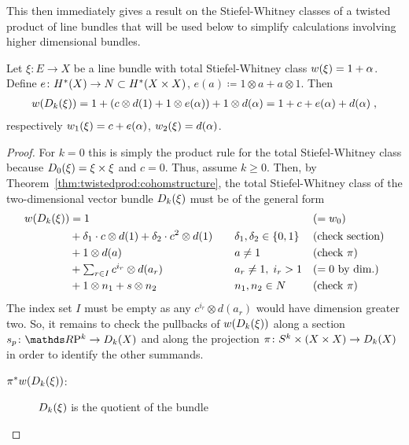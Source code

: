 This then immediately gives a result on the Stiefel-Whitney classes of
a twisted product of line bundles that will be used below to simplify
calculations involving higher dimensional bundles.
\begin{Cor}\label{cor:twistedprod:swlinebdl}
  Let $\xi\colon E\to X$ be a line bundle with total Stiefel-Whitney
  class ${w}(\xi)=1+\alpha$.
  Define $e\colon H^*(X)\to N\subset H^*(X\times X)$,
  $e(a)\coloneqq 1\otimes a+a\otimes 1$.
  Then
  \begin{gather*}
    {w}(D_{k}({\xi})) = 1+ (c\otimes d(1)+1\otimes
    e(\alpha)) + 1\otimes d(\alpha)
    = 1+c+e(\alpha)+d(\alpha)
    \;,
  \end{gather*}
  respectively ${w_{1}}(\xi) = c+e(\alpha)$, ${w_{2}}(\xi)=d(\alpha)$.
  \begin{proof}
    For $k=0$ this is simply the product rule for the total
    Stiefel-Whitney class because $D_{0}({\xi})=\xi\times\xi$
    and $c=0$. Thus, assume $k\geq0$.
    Then, by Theorem~\ref{thm:twistedprod:cohomstructure}, the total
    Stiefel-Whitney class of the two-dimensional vector bundle
    $D_{k}({\xi})$ must be of the general form
    \begin{align*}
      {w}(D_{k}({\xi}))
      &=
        1 &\quad&&&{(=w_{0})} \\
      &+ \delta_1\cdot c\otimes d(1) + \delta_2\cdot c^2\otimes d(1)
          &&\delta_1,\delta_2\in\{0,1\}
                &&{(\text{check section})}\\
      &+ 1\otimes d(a)
          &&a \neq 1
                &&{(\text{check $\pi$})} \\
      &+ {\textstyle \sum_{r\in I} c^{i_r}\otimes d(a_r)}
          &&a_r\neq 1,\; i_r>1
                &&{(=0\text{ by dim.})} \\
      &+ 1\otimes n_1 + s\otimes n_2
          &&n_1, n_2\in N
                &&{(\text{check $\pi$})}
    \end{align*}
    The index set $I$ must be empty as any $c^{i_r}\otimes d(a_r)$
    would have dimension greater two.
    So, it remains to check the pullbacks of ${w}(D_{k}({\xi}))$
    along a section $s_p\colon\RP k\to\Twistedprod{k}{X}$ and along
    the projection
    $\pi\colon S^{k}\times(X\times X)\to D_{k}({X})$
    in order to identify the other summands.
    \begin{description}
    \item[${\pi}^*{w}(D_{k}({\xi}))$:]
      $D_{k}({\xi})$ is the quotient of the bundle

\end{description}
\end{proof}
\end{Cor}
